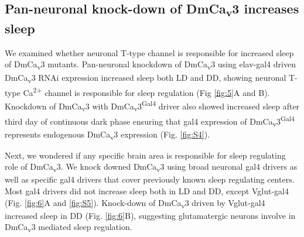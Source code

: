 \subsection*{Pan-neuronal knock-down of DmCa\textsubscript{v}3 increases sleep}

We examined whether neuronal T-type channel is responsible for increased sleep of DmCa\textsubscript{v}3 mutants.
Pan-neuronal knockdown of DmCa\textsubscript{v}3 using elav-gal4 driven DmCa\textsubscript{v}3 RNAi expression increased sleep both LD and DD, showing neuronal T-type Ca\textsuperscript{2+} channel is responsible for sleep regulation (Fig \ref{fig:5}A and B).
Knockdown of DmCa\textsubscript{v}3 with DmCa\textsubscript{v}3\textsuperscript{Gal4} driver also showed increased sleep after third day of continuous dark phase ensuring that gal4 expression of DmCa\textsubscript{v}3\textsuperscript{Gal4} represents endogenous DmCa\textsubscript{v}3 expression (Fig. \ref{fig:S4}). 

Next, we wondered if any specific brain area is responsible for sleep regulating role of DmCa\textsubscript{v}3.
We knock downed DmCa\textsubscript{v}3 using broad neuronal gal4 drivers as well as specific gal4 drivers that cover previously known sleep regulating centers.
Most gal4 drivers did not increase sleep both in LD and DD, except Vglut-gal4 (Fig. \ref{fig:6}A and \ref{fig:S5}).
Knock-down of DmCa\textsubscript{v}3 driven by Vglut-gal4 increased sleep in DD (Fig. \ref{fig:6}B), suggesting glutamatergic neurons involve in DmCa\textsubscript{v}3 mediated sleep regulation.
    